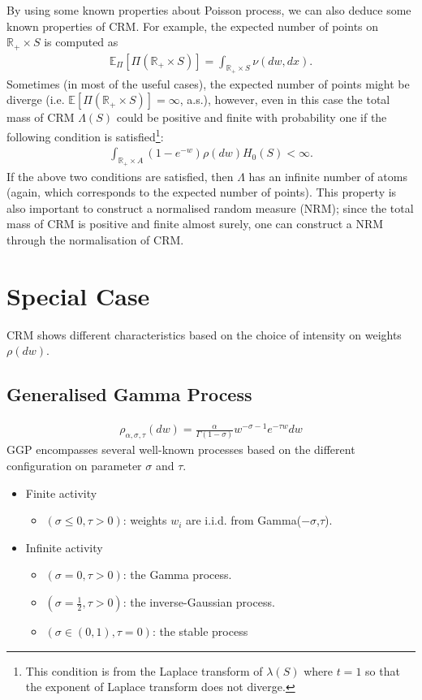 \documentclass{article}
\begin{document}
By using some known properties about Poisson process, we can also deduce some known properties of CRM. For example, the expected number of points on $\mathbb{R}_+ \times S$ is computed as
\begin{align}
\mathbb{E}_\Pi[\Pi(\mathbb{R}_+ \times S)] = \int_{\mathbb{R}_+ \times S} \nu(dw,dx).
\end{align}
Sometimes (in most of the useful cases), the expected number of points might be diverge (i.e. $\mathbb{E}[\Pi(\mathbb{R}_+ \times S)] = \infty$, a.s.), however, even in this case the total mass of CRM $\Lambda(S)$ could be positive and finite with probability one if the following condition is satisfied\footnote{This condition is from the Laplace transform of $\lambda(S)$ where $t=1$ so that the exponent of Laplace transform does not diverge.}:
\begin{align}
\int_{\mathbb{R}_+ \times A} (1- e^{-w}) \rho(dw)H_0(S) < \infty.
\end{align}
If the above two conditions are satisfied, then $\Lambda$ has an infinite number of atoms (again, which corresponds to the expected number of points). This property is also important to construct a normalised random measure (NRM); since the total mass of CRM is positive and finite almost surely, one can construct a NRM through the normalisation of CRM.

\section{Special Case}
CRM shows different characteristics based on the choice of intensity on weights $\rho(dw)$. 

\subsection{Generalised Gamma Process}

\begin{align}
\rho_{\alpha, \sigma, \tau}(dw) = \frac{\alpha}{\Gamma(1-\sigma)}w^{-\sigma - 1}e^{-\tau w} dw
\end{align}
GGP encompasses several well-known processes based on the different configuration on parameter $\sigma$ and $\tau$. 
\begin{itemize}
\item Finite activity
\begin{itemize}
\item $(\sigma \le 0, \tau > 0)$: weights $w_i$ are i.i.d. from Gamma($-\sigma$,$\tau$).
\end{itemize}
\item Infinite activity
\begin{itemize}
\item $(\sigma = 0, \tau > 0)$: the Gamma process.
\item $(\sigma = \frac{1}{2}, \tau > 0)$: the inverse-Gaussian process.
\item $(\sigma \in (0, 1), \tau = 0)$: the stable process 
\end{itemize}
\end{itemize}
\end{document}
